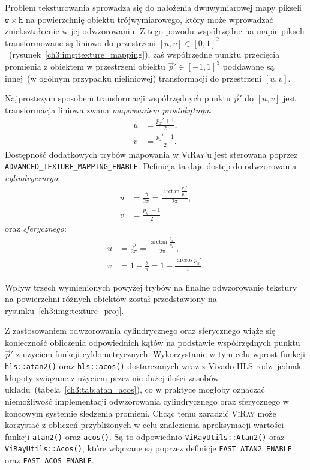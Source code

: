 \begin{enumerate}
Problem teksturowania sprowadza się do nałożenia dwuwymiarowej mapy pikseli $\mathtt{w}\times\mathtt{h}$ na powierzchnię obiektu trójwymiarowego, który może wprowadzać zniekształcenie w jej odwzorowaniu. Z tego powodu współrzędne na mapie pikseli transformowane są liniowo do przestrzeni $[u, v] \in [0, 1]^2$~(rysunek~\ref{ch3:img:texture_mapping}), zaś współrzędne punktu przecięcia promienia z obiektem w przestrzeni obiektu $\vec{p}'\in[-1, 1]^3$ poddawane są innej~(w ogólnym przypadku nieliniowej) transformacji do przestrzeni $[u, v]$. 



Najprostszym sposobem transformacji współrzędnych punktu $\vec{p}'$ do $[u,v]$ jest transformacja liniowa zwana \textit{mapowaniem prostokątnym}:
\begin{align*}
u &= \frac{p_x' + 1}{2},\\
v &= \frac{p_z' + 1}{2}.
\end{align*}
Dostępność dodatkowych trybów mapowania w \textsc{ViRay}'u jest sterowana poprzez \texttt{ADVANCED\_TEXTURE\_MAPPING\_ENABLE}. Definicja ta daje dostęp do odwzorowania \textit{cylindrycznego}:
\begin{align*}
u &= \frac{\phi}{2\pi} = \frac{\arctan\frac{p_x'}{p_z'}}{2\pi},\\
v &= \frac{p_y' + 1}{2}
\end{align*} 
oraz \textit{sferycznego}:
\begin{align*}
u &= \frac{\phi}{2\pi} = \frac{\arctan\frac{p_x'}{p_z'}}{2\pi},\\
v &= 1 - \frac{\theta}{\pi} = 1 - \frac{\arccos p_y'}{\pi}.
\end{align*} 

Wpływ trzech wymienionych powyżej trybów na finalne odwzorowanie tekstury na powierzchni różnych obiektów został przedstawiony na rysunku~\ref{ch3:img:texture_proj}.



Z zastosowaniem odwzorowania cylindrycznego oraz sferycznego wiąże się konieczność obliczenia odpowiednich kątów na podstawie współrzędnych punktu $\vec{p}'$ z użyciem funkcji cyklometrycznych. Wykorzystanie w tym celu wprost funkcji \texttt{hls::atan2()} oraz \texttt{hls::acos()} dostarczanych wraz z Vivado HLS rodzi jednak kłopoty związane z użyciem przez nie dużej ilości zasobów układu~(tabela~\ref{ch3:tab:atan_acos}), co w praktyce mogłoby oznaczać niemożliwość implementacji odwzorowania cylindrycznego oraz sferycznego w końcowym systemie śledzenia promieni. Chcąc temu zaradzić \textsc{ViRay} może korzystać z obliczeń przybliżonych w celu znalezienia aproksymacji wartości funkcji \texttt{atan2()} oraz \texttt{acos()}. Są to odpowiednio \texttt{ViRayUtils::Atan2()} oraz \texttt{ViRayUtils::Acos()}, które włączane są poprzez definicje \texttt{FAST\_ATAN2\_ENABLE} oraz \texttt{FAST\_ACOS\_ENABLE}.


\end{enumerate}
